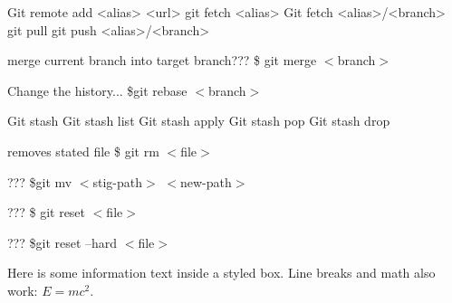 Git remote add <alias> <url>
git fetch <alias>
Git fetch <alias>/<branch>
git pull
git push <alias>/<branch>


\begin{tcolorbox}[ titleBox, title=MERGE \& REBASE]
    \begin{tcolorbox}[innerBox]
        merge current branch into target branch???
      \tcblower
        \$ git merge $<$branch$>$
    \end{tcolorbox}

    \begin{tcolorbox}[innerBox]
        Change the history...
    \tcblower
        \$git rebase $<$branch$>$
    \end{tcolorbox}
\end{tcolorbox}

Git stash
Git stash list
Git stash apply
Git stash pop
Git stash drop

\begin{tcolorbox}[ titleBox, title=TRACKING PATH CHANGES]
    \begin{tcolorbox}[innerBox]
        removes stated file
      \tcblower
        \$ git rm $<$file$>$
    \end{tcolorbox}

    \begin{tcolorbox}[innerBox]
        ???
    \tcblower
        \$git mv $<$stig-path$>$ $<$new-path$>$
    \end{tcolorbox}
\end{tcolorbox}


\begin{tcolorbox}[ titleBox, title=UNDO]
    \begin{tcolorbox}[innerBox]
        ???
      \tcblower
        \$ git reset $<$file$>$
    \end{tcolorbox}

    \begin{tcolorbox}[innerBox]
        ???
    \tcblower
        \$git reset --hard $<$file$>$
    \end{tcolorbox}

    \begin{tcolorbox}[infoBox]
    
    Here is some information text inside a styled box.  
    Line breaks and math also work: \( E = mc^2 \).
    
    \end{tcolorbox}

\end{tcolorbox}